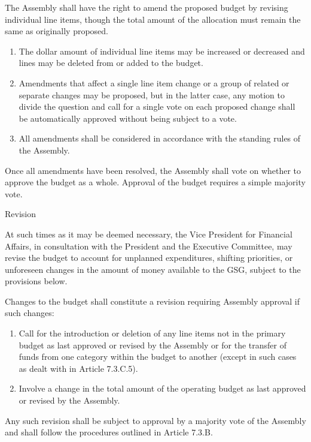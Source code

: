 \begin{bylaws-number}
\begin{bylaws-number}
    \item The Assembly shall have the right to amend the proposed budget by revising individual line items, though the total amount of the allocation must remain the same as originally proposed.
    \begin{enumerate}[i]
      \item The dollar amount of individual line items may be increased or decreased and lines may be deleted from or added to the budget.
      \item Amendments that affect a single line item change or a group of related or separate changes may be proposed, but in the latter case, any motion to divide the question and call for a single vote on each proposed change shall be automatically approved without being subject to a vote.
      \item All amendments shall be considered in accordance with the standing rules of the Assembly.
    \end{enumerate}
    \item Once all amendments have been resolved, the Assembly shall vote on whether to approve the budget as a whole. Approval of the budget requires a simple majority vote.
  \end{bylaws-number}
  \item Revision
  \begin{bylaws-number}
    \item At such times as it may be deemed necessary, the Vice President for Financial Affairs, in consultation with the President and the Executive Committee, may revise the budget to account for unplanned expenditures, shifting priorities, or unforeseen changes in the amount of money available to the GSG, subject to the provisions below.
    \item Changes to the budget shall constitute a revision requiring Assembly approval if such changes:
    \begin{enumerate}[i]
      \item Call for the introduction or deletion of any line items not in the primary budget as last approved or revised by the Assembly or for the transfer of funds from one category within the budget to another (except in such cases as dealt with in Article 7.3.C.5).
      \item Involve a change in the total amount of the operating budget as last approved or revised by the Assembly.
    \end{enumerate}
    \item Any such revision shall be subject to approval by a majority vote of the Assembly and shall follow the procedures outlined in Article 7.3.B.

\end{bylaws-number}
\end{bylaws-number}
